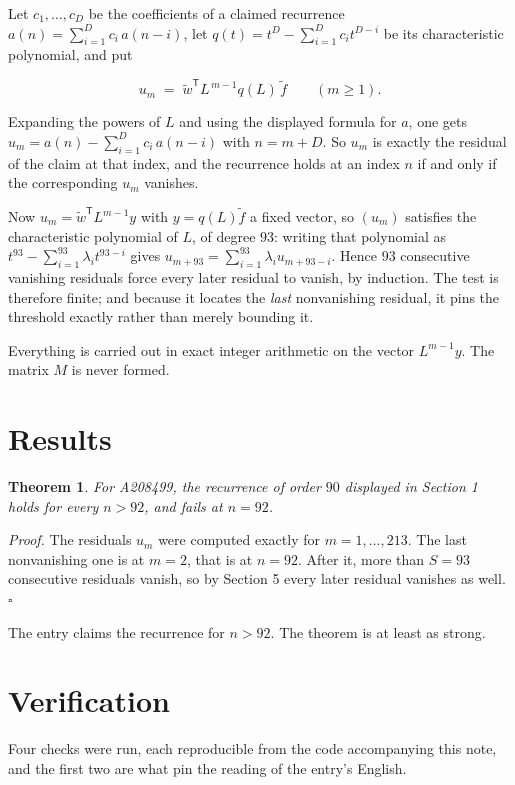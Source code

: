 \documentclass[11pt]{article}
\newtheorem{theorem}{Theorem}
\theoremstyle{definition}
\begin{document}
Let $c_1,\dots,c_D$ be the coefficients of a claimed recurrence $a(n) = \sum_{i=1}^{D} c_i\,a(n-i)$, let $q(t) = t^{D} - \sum_{i=1}^{D} c_i t^{D-i}$ be its characteristic polynomial, and put

\[u_m \;=\; \tilde w^{\mathsf T} L^{\,m-1} q(L)\,\tilde f \qquad (m \ge 1).\]

Expanding the powers of $L$ and using the displayed formula for $a$, one gets $u_m = a(n) - \sum_{i=1}^{D} c_i\,a(n-i)$ with $n = m + D$. So $u_m$ is exactly the residual of the claim at that index, and the recurrence holds at an index $n$ if and only if the corresponding $u_m$ vanishes.

Now $u_m = \tilde w^{\mathsf T} L^{m-1} y$ with $y = q(L)\tilde f$ a fixed vector, so $(u_m)$ satisfies the characteristic polynomial of $L$, of degree $93$: writing that polynomial as $t^{93} - \sum_{i=1}^{93} \lambda_i t^{93-i}$ gives $u_{m+93} = \sum_{i=1}^{93} \lambda_i u_{m+93-i}$. Hence $93$ consecutive vanishing residuals force every later residual to vanish, by induction. The test is therefore finite; and because it locates the {\itshape last} nonvanishing residual, it pins the threshold exactly rather than merely bounding it.

Everything is carried out in exact integer arithmetic on the vector $L^{m-1}y$. The matrix $M$ is never formed.

\section{Results}

\begin{theorem} For A208499, the recurrence of order $90$ displayed in Section 1 holds for every $n > 92$, and fails at $n = 92$.\end{theorem}

{\itshape Proof.} The residuals $u_m$ were computed exactly for $m = 1,\dots,213$. The last nonvanishing one is at $m = 2$, that is at $n = 92$. After it, more than $S = 93$ consecutive residuals vanish, so by Section 5 every later residual vanishes as well. $\square$

The entry claims the recurrence for $n > 92$. The theorem is at least as strong.

\section{Verification}

Four checks were run, each reproducible from the code accompanying this note, and the first two are what pin the reading of the entry's English.
\end{document}
